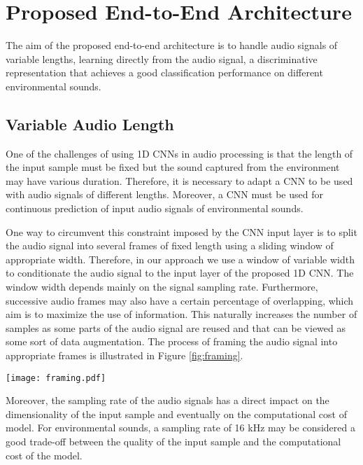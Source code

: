 \documentclass[preprint,final,12pt]{elsarticle}
\begin{document}
\section{Proposed End-to-End Architecture}
\label{sec:arch}
The aim of the proposed end-to-end architecture is to handle audio signals of variable lengths, learning directly from the audio signal, a discriminative representation that achieves a good classification performance on different environmental sounds. 

\subsection{Variable Audio Length}
\label{sub:audiolengths}
One of the challenges of using 1D CNNs in audio processing is that the length of the input sample must be fixed but the sound captured from the environment may have various duration. Therefore, it is necessary to adapt a CNN to be used with audio signals of different lengths. Moreover, a CNN must be used for continuous prediction of input audio signals of environmental sounds.

One way to circumvent this constraint imposed by the CNN input layer is to split the audio signal into several frames of fixed length using a sliding window of appropriate width. Therefore, in our approach we use a window of variable width to conditionate the audio signal to the input layer of the proposed 1D CNN. The window width depends mainly on the signal sampling rate. Furthermore, successive audio frames may also have a certain percentage of overlapping, which aim is to maximize the use of information. This naturally increases the number of samples as some parts of the audio signal are reused and that can be viewed as some sort of data augmentation. The process of framing the audio signal into appropriate frames is illustrated in Figure \ref{fig:framing}.


\begin{figure*}[htpb!]
  \centering
  \texttt{[image: framing.pdf]}
  \caption{Framing the input audio signal into several frames () with appropriate overlapping percentage (.}
  \label{fig:framing}
\end{figure*}


Moreover, the sampling rate of the audio signals has a direct impact on the dimensionality of the input sample and eventually on the computational cost of model. For environmental sounds, a sampling rate of 16 kHz may be considered a good trade-off between the quality of the input sample and the computational cost of the model. 
\end{document}
